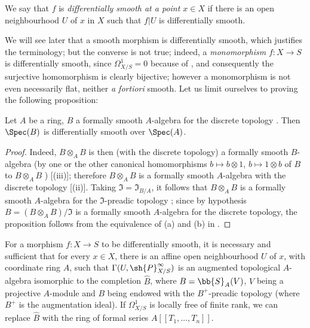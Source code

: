 We say that $f$ is \emph{differentially smooth at a point $x \in X$} if there is an open neighbourhood $U$ of $x$ in $X$ such that $f|U$ is differentially smooth.

We will see later  that a smooth morphism is differentially smooth, which justifies the terminology;
but the converse is not true;
indeed, a \emph{monomorphism} $f:X \to S$ is differentially smooth, since $\Omega^1_{X/S} = 0$ because of , and consequently the surjective homomorphism  is clearly bijective;
however a monomorphism is not even necessarily flat, neither \textit{a fortiori} smooth. 
Let us limit ourselves to proving the following proposition:

\begin{proposition}[16.10.2]
\label{IV.16.10.2}
Let $A$ be a ring, $B$ a formally smooth $A$-algebra for the discrete topology .
Then $\Spec(B)$ is differentially smooth over $\Spec(A)$.
\end{proposition}

\begin{proof}
Indeed, $B \otimes_A B$ is then (with the discrete topology) a formally smooth $B$-algebra (by one or the other canonical homomorphisms $b \mapsto b \otimes 1$, $b \mapsto 1 \otimes b$ of $B$
to $B \otimes_A B$
) [(iii)];
therefore $B \otimes_A B$ is a formally smooth $A$-algebra with the discrete topology [(ii)].
Taking $\mathfrak{I} = \mathfrak{I}_{B/A}$, it follows that $B \otimes_A B$ is a formally smooth $A$-algebra for the $\mathfrak{I}$-preadic topology ;
since by hypothesis $B = (B \otimes_A B)/\mathfrak{I}$ is a formally smooth $A$-algebra for the discrete topology, the proposition follows from the equivalence of (a) and (b) in .
\end{proof}

\begin{proposition}[16.10.3]
\label{IV.16.10.3}
For a morphism $f:X \to S$ to be differentially smooth, it is necessary and sufficient that for every $x \in X$, there is an affine open neighbourhood $U$ of $x$, with coordinate ring $A$, such that $\Gamma(U, \sh{P}_{X/S}^\infty)$ is an augmented topological $A$-algebra isomorphic to the completion $\widehat{B}$, where $B = \bb{S}_A(V)$, $V$ being a projective $A$-module and $B$ being endowed with the $B^+$-preadic topology (where $B^+$ is the augmentation ideal).
If $\Omega_{X/S}^1$ is locally free of finite rank, we can replace $\widehat{B}$ with the ring of formal series $A[[T_1, \dots, T_n]]$.
\end{proposition}

